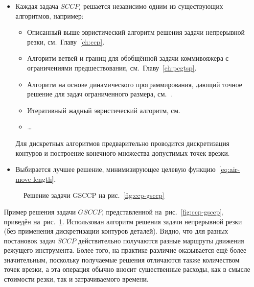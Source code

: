 \begin{itemize}
  \item
  Каждая задача
  $SCCP_i$
  решается независимо одним из существующих алгоритмов, например:
  \begin{itemize}
    \item
    Описанный выше эвристический алгоритм решения задачи непрерывной резки,
    см.~Главу~\ref{ch:ccp}.
    \item
    Алгоритм ветвей и границ для обобщённой задачи коммивояжера
    с ограничениями предшествования,
    см.~Главу~\ref{ch:pcgtsp}.
    \item
    Алгоритм на основе динамического программирования,
    дающий точное решение для задач ограниченного размера,
    см.~\cite{bi:RoMa}.
    \item
    Итеративный жадный эвристический алгоритм,
    см.~\cite{bi:greedy}
    \item \dots
  \end{itemize}
  Для дискретных алгоритмов предварительно проводится
  дискретизация контуров и построение конечного
  множества допустимых точек врезки.
  \item
  Выбирается лучшее решение,
  минимизирующее целевую функцию~\eqref{eq:air-move-length}.
\end{itemize}

\begin{figure}
  \centering
  \caption{Решение задачи GSCCP на рис.~\ref{fig:ccp-gsccp}}
  \label{fig:ccp-gsccp-solution}
\end{figure}

Пример решения задачи $GSCCP$,
представленной на~рис.~\ref{fig:ccp-gsccp},
приведён на~рис.~\ref{fig:ccp-gsccp-solution}.
Использован алгоритм решения задачи непрерывной резки
(без применения дискретизации контуров деталей).
Видно, что для разных постановок задач $SCCP$
действительно получаются разные маршруты
движения режущего инструмента.
Более того,
на практике различие
оказывается ещё более значительным,
поскольку получаемые решения отличаются
также количеством точек врезки,
а эта операция обычно вносит существенные расходы,
как в смысле стоимости резки,
так и затрачиваемого времени.
